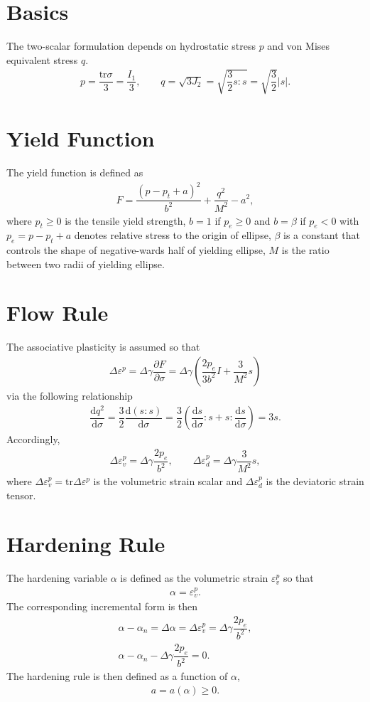 \documentclass[10pt,fleqn,3p]{elsarticle}
\newcommand*{\md}[1]{\mathrm{d}#1}
\newcommand*{\tr}[1]{\mathrm{tr}#1}
\newcommand*{\ddfrac}[2]{\dfrac{\md#1}{\md#2}}
\newcommand*{\pfrac}[2]{\dfrac{\partial#1}{\partial#2}}
\begin{document}
\pagestyle{empty}
\section{Basics}
The two-scalar formulation depends on hydrostatic stress $p$ and von Mises equivalent stress $q$.
\begin{gather}
p=\dfrac{\tr{\sigma}}{3}=\dfrac{I_1}{3},\qquad{}q=\sqrt{3J_2}=\sqrt{\dfrac{3}{2}s:s}=\sqrt{\dfrac{3}{2}}|s|.
\end{gather}
\section{Yield Function}
The yield function is defined as
\begin{gather}
F=\dfrac{\left(p-p_t+a\right)^2}{b^2}+\dfrac{q^2}{M^2}-a^2,
\end{gather}
where $p_t\geqslant0$ is the tensile yield strength, $b=1$ if $p_e\geqslant0$ and $b=\beta$ if $p_e<0$ with $p_e=p-p_t+a$ denotes relative stress to the origin of ellipse, $\beta$ is a constant that controls the shape of negative-wards half of yielding ellipse, $M$ is the ratio between two radii of yielding ellipse.
\section{Flow Rule}
The associative plasticity is assumed so that
\begin{gather}
\Delta\varepsilon^p=\Delta\gamma\pfrac{F}{\sigma}=\Delta\gamma\left(\dfrac{2p_e}{3b^2}I+\dfrac{3}{M^2}s\right)
\end{gather}
via the following relationship
\begin{gather*}
\ddfrac{q^2}{\sigma}=\dfrac{3}{2}\ddfrac{\left(s:s\right)}{\sigma}=\dfrac{3}{2}\left(\ddfrac{s}{\sigma}:s+s:\ddfrac{s}{\sigma}\right)=3s.
\end{gather*}
Accordingly,
\begin{gather}
\Delta\varepsilon^p_v=\Delta\gamma\dfrac{2p_e}{b^2},\qquad\Delta\varepsilon^p_d=\Delta\gamma\dfrac{3}{M^2}s,
\end{gather}
where $\Delta\varepsilon^p_v=\tr{\Delta\varepsilon^p}$ is the volumetric strain scalar and $\Delta\varepsilon^p_d$ is the deviatoric strain tensor.
\section{Hardening Rule}
The hardening variable $\alpha$ is defined as the volumetric strain $\varepsilon^p_v$ so that
\begin{gather}
\alpha=\varepsilon^p_v.
\end{gather}
The corresponding incremental form is then
\begin{gather}
\alpha-\alpha_n=\Delta\alpha=\Delta\varepsilon^p_v=\Delta\gamma\dfrac{2p_e}{b^2},\\
\alpha-\alpha_n-\Delta\gamma\dfrac{2p_e}{b^2}=0.
\end{gather}
The hardening rule is then defined as a function of $\alpha$,
\begin{gather}
a=a\left(\alpha\right)\geqslant0.
\end{gather}
\end{document}
